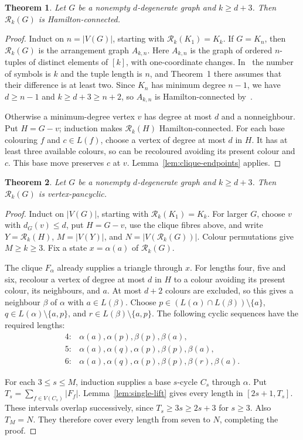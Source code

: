 \documentclass[11pt]{article}
\newtheorem{theorem}{Theorem}[section]
\theoremstyle{remark}
\newcommand{\Rk}{\mathcal R_k}
\numberwithin{equation}{section}
\numberwithin{table}{section}
\begin{document}
\begin{theorem}\label{thm:degenerate-hc}
Let $G$ be a nonempty $d$-degenerate graph and $k\ge d+3$.
Then $\Rk(G)$ is Hamilton-connected.
\end{theorem}
\begin{proof}
Induct on $n=|V(G)|$, starting with $\Rk(K_1)=K_k$.
If $G=K_n$, then $\Rk(G)$ is the arrangement graph $A_{k,n}$.
Here $A_{k,n}$ is the graph of ordered $n$-tuples of distinct elements of
$[k]$, with one-coordinate changes.  In~\cite{HLTH04} the number of
symbols is $k$ and the tuple length is $n$, and Theorem~1 there assumes
that their difference is at least two.  Since $K_n$ has minimum degree
$n-1$, we have $d\ge n-1$ and $k\ge d+3\ge n+2$, so $A_{k,n}$ is
Hamilton-connected by~\cite[Theorem~1]{HLTH04}.

Otherwise a minimum-degree vertex $v$ has degree at most $d$ and
a nonneighbour. Put $H=G-v$; induction makes $\Rk(H)$
Hamilton-connected. For each base colouring $f$ and $c\in L(f)$,
choose a vertex of degree at most $d$ in $H$. It has at least three
available colours, so can be recoloured avoiding its present colour
and $c$. This base move preserves $c$ at $v$.
Lemma~\ref{lem:clique-endpoints} applies.
\end{proof}

\begin{theorem}\label{thm:degenerate-vp}
Let $G$ be a nonempty $d$-degenerate graph and $k\ge d+3$.
Then $\Rk(G)$ is vertex-pancyclic.
\end{theorem}

\begin{proof}
Induct on $|V(G)|$, starting with $\Rk(K_1)=K_k$. For larger $G$,
choose $v$ with $d_G(v)\le d$, put $H=G-v$, use the clique fibres
above, and write $Y=\Rk(H)$, $M=|V(Y)|$, and $N=|V(\Rk(G))|$.
Colour permutations give $M\ge k\ge3$.
Fix a state $x=\alpha(a)$ of $\Rk(G)$.

The clique $F_\alpha$ already supplies a triangle through $x$.
For lengths four, five and six, recolour a vertex of degree at most
$d$ in $H$ to a colour avoiding its present colour, its neighbours,
and $a$. At most $d+2$ colours are excluded, so this gives a neighbour
$\beta$ of $\alpha$ with $a\in L(\beta)$.
Choose $p\in(L(\alpha)\cap L(\beta))\setminus\{a\}$,
$q\in L(\alpha)\setminus\{a,p\}$, and
$r\in L(\beta)\setminus\{a,p\}$.
The following cyclic sequences have the required lengths:
\[
\begin{array}{ll}
4:&\alpha(a),\alpha(p),\beta(p),\beta(a),\\
5:&\alpha(a),\alpha(q),\alpha(p),\beta(p),\beta(a),\\
6:&\alpha(a),\alpha(q),\alpha(p),\beta(p),\beta(r),\beta(a).
\end{array}
\]

For each $3\le s\le M$, induction supplies a base $s$-cycle $C_s$
through $\alpha$. Put $T_s=\sum_{f\in V(C_s)}|F_f|$.
Lemma~\ref{lem:single-lift} gives every length in $[2s+1,T_s]$.
These intervals overlap successively, since $T_s\ge3s\ge2s+3$
for $s\ge3$. Also $T_M=N$. They therefore cover every length
from seven to $N$, completing the proof.
\end{proof}
\end{document}
